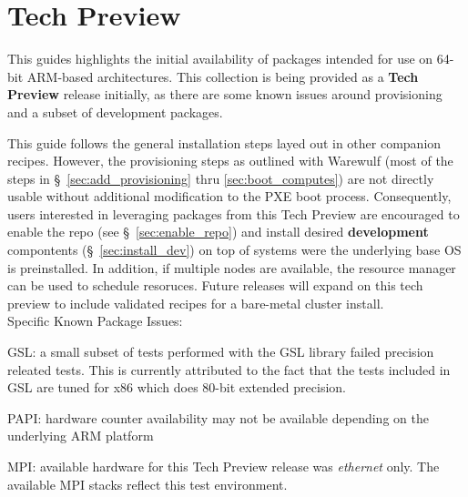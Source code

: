 \section{Tech Preview}

This guides highlights the initial availability of \OHPC{} packages intended
for use on 64-bit ARM-based architectures. This collection is being provided as
a {\bf Tech Preview} release initially, as there are some known issues around
provisioning and a subset of development packages.

This guide follows the general installation steps layed out in other companion
\OHPC{} recipes.  However, the provisioning steps as outlined with Warewulf
(most of the steps in \S~\ref{sec:add_provisioning} thru
\ref{sec:boot_computes}) are not directly usable without additional
modification to the PXE boot process.  Consequently, users interested in
leveraging packages from this Tech Preview are encouraged to enable the repo
(see \S~\ref{sec:enable_repo}) and install desired {\bf development}
compontents (\S~\ref{sec:install_dev}) on top of systems were the underlying
base OS is preinstalled. In addition, if multiple nodes are available, the
\rms{} resource manager can be used to schedule resoruces. Future \OHPC{} releases
will expand on this tech preview to include validated recipes for a bare-metal
cluster install. \\

\noindent Specific Known Package Issues: 
\begin{itemize*}
\item GSL: a small subset of tests performed with the GSL library failed
  precision releated tests. This is currently attributed to the fact that the
  tests included in GSL are tuned for x86 which does 80-bit extended precision.
  \item PAPI: hardware counter availability may not be available depending on
    the underlying ARM platform
  \item MPI: available hardware for this Tech Preview release was {\em
    ethernet} only. The available MPI stacks reflect this test environment.
\end{itemize*}

